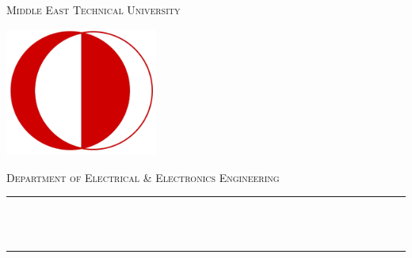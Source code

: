\begin{titlepage}

\newcommand{\HRule}{\rule{\linewidth}{0.5mm}} %



\begin{minipage}{0.65\textwidth}
\center
\textsc{\huge Middle East Technical University}

\end{minipage} \hfill
\begin{minipage}{0.3\textwidth}
\includegraphics[width = 5cm]{./figures/odtu_logo.png}
\end{minipage}

\center %

\textsc{\LARGE Department of \newline Electrical \& Electronics Engineering}


\vspace{3.4cm}

\HRule \\[0.4cm]
{ \huge \bfseries \reporttitle}\\ %
\HRule \\[1.5cm]

\vspace{2.6cm}
 


\end{titlepage}

